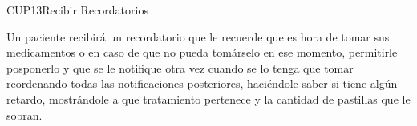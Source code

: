 \begin{UseCase}{CUP13}{Recibir Recordatorios}
    {
    	Un paciente recibirá un recordatorio que le recuerde que es hora de tomar sus medicamentos o en caso de que no pueda tomárselo en ese momento, permitirle posponerlo y que se le notifique otra vez cuando se lo tenga que tomar reordenando todas las notificaciones posteriores, haciéndole saber si tiene algún retardo, mostrándole a que tratamiento pertenece y la cantidad de pastillas que le sobran.
    	
    }
    

\end{UseCase}
